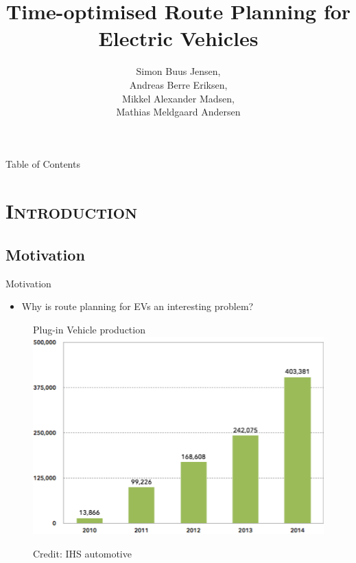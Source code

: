 
\begin{frame}
\title{\huge Time-optimised Route Planning for Electric Vehicles}
\author{
 Simon Buus Jensen,\\
 Andreas Berre Eriksen,\\
 Mikkel Alexander Madsen,\\
 Mathias Meldgaard Andersen\\
}
\titlepage
\end{frame}

\begin{frame}{Table of Contents}
\tableofcontents
\end{frame}

\section{\scshape Introduction}
\subsection{Motivation}
\begin{frame}{Motivation}
\begin{itemize}
\item Why is route planning for EVs an interesting problem?
\end{itemize}
\begin{figure}[h!]
  \centering
  Plug-in Vehicle production
    \includegraphics[height=0.5\textwidth]{images/forecast}
  
      \tiny Credit: IHS automotive
\end{figure}
\end{frame}

